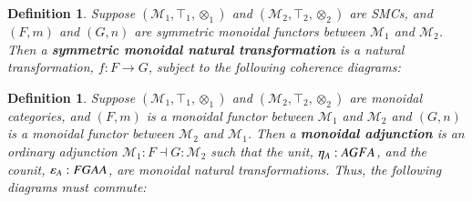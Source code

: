 \documentclass{article}
\newtheorem{definition}[theorem]{Definition}
\let\mto\to
\let\to\relax
\newcommand{\to}{\rightarrow}
\newcommand{\cat}[1]{\mathcal{#1}}
\newcommand{\p}[1]{\mathsf{p}_{#1}}
\newcommand{\q}[1]{\mathsf{q}_{#1}}
\begin{document}
\begin{definition}
  \label{def:SMCNAT}
  Suppose $(\cat{M}_1,\top_1,\otimes_1)$ and $(\cat{M}_2,\top_2,\otimes_2)$
  are SMCs, and $(F,m)$ and $(G,n)$ are symmetric monoidal functors
  between $\cat{M}_1$ and $\cat{M}_2$.  Then a \textbf{symmetric
    monoidal natural transformation} is a natural transformation,
  $f : F \mto G$, subject to the following coherence diagrams:
\end{definition}

\begin{definition}
  \label{def:MCADJ}
  Suppose $(\cat{M}_1,\top_1,\otimes_1)$ and $(\cat{M}_2,\top_2,\otimes_2)$
  are monoidal categories, and $(F,m)$ is a monoidal functor between
  $\cat{M}_1$ and $\cat{M}_2$ and $(G,n)$ is a monoidal
  functor between $\cat{M}_2$ and $\cat{M}_1$.  Then a
  \textbf{monoidal adjunction} is an ordinary adjunction
  $\cat{M}_1 : F \dashv G : \cat{M}_2$ such that the unit,
  $\eta_A : A \to GFA$, and the counit, $\varepsilon_A : FGA \to A$, are
  monoidal natural transformations.  Thus, the following
  diagrams must commute:
\end{definition}
\end{document}
